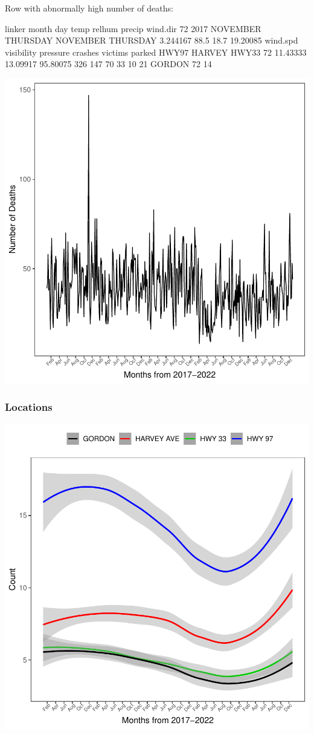\documentclass[11pt, a4paper]{article}
\begin{document}
\begin{Schunk}
\begin{Soutput}
Row with abnormally high number of deaths:
\end{Soutput}
\begin{Soutput}
                   linker    month      day     temp relhum precip wind.dir
72 2017 NOVEMBER THURSDAY NOVEMBER THURSDAY 3.244167   88.5   18.7 19.20085
   wind.spd visibility pressure crashes victims parked HWY97 HARVEY HWY33
72 11.43333   13.09917 95.80075     326     147     70    33     10    21
   GORDON
72     14
\end{Soutput}
\end{Schunk}
\includegraphics{variableinvestigation-043}


\subsubsection{Locations}

\includegraphics{variableinvestigation-044}
\end{document}
